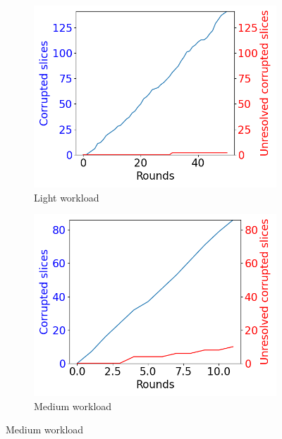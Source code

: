 \documentclass[a4paper,11pt,oneside]{report}
\begin{document}
\begin{figure}[ht]
     \centering
     \begin{subfigure}[b]{0.3\textwidth}
         \centering
         \includegraphics[width=\textwidth]{Figures/mitigated_corruption_rate_300KB.png}
         \caption{Light workload}
         \label{fig:among_mitigated_slice_light}
     \end{subfigure}
     \hfill
     \begin{subfigure}[b]{0.3\textwidth}
         \centering
         \includegraphics[width=\textwidth]{Figures/mitigated_corruption_rate_1MB.png}
         \caption{Medium workload}
         \label{fig:among_mitigated_slice_medium}
     \end{subfigure}

\end{figure}
\end{document}

